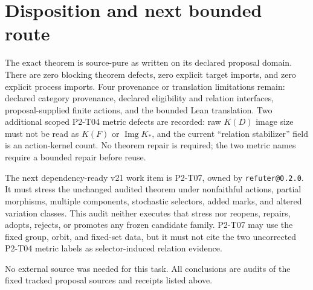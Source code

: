 \documentclass[11pt]{article}
\begin{document}
\section{Disposition and next bounded route}

The exact theorem is source-pure as written on its declared proposal domain.
There are zero blocking theorem defects, zero explicit target imports, and zero
explicit process imports.  Four provenance or translation limitations remain:
declared category provenance, declared eligibility and relation interfaces,
proposal-supplied finite actions, and the bounded Lean translation.  Two
additional scoped P2-T04 metric defects are recorded: raw \(K(D)\) image size
must not be read as \(K(F)\) or \(\operatorname{Img}K_*\), and the current
``relation stabilizer'' field is an action-kernel count.  No theorem repair is
required; the two metric names require a bounded repair before reuse.

The next dependency-ready v21 work item is P2-T07, owned by
\texttt{refuter@0.2.0}.  It must stress the unchanged audited theorem under
nonfaithful actions, partial morphisms, multiple components, stochastic
selectors, added marks, and altered variation classes.  This audit neither
executes that stress nor reopens, repairs, adopts, rejects, or promotes any
frozen candidate family.  P2-T07 may use the fixed group, orbit, and fixed-set
data, but it must not cite the two uncorrected P2-T04 metric labels as
selector-induced relation evidence.

No external source was needed for this task.  All conclusions are audits of
the fixed tracked proposal sources and receipts listed above.
\end{document}
